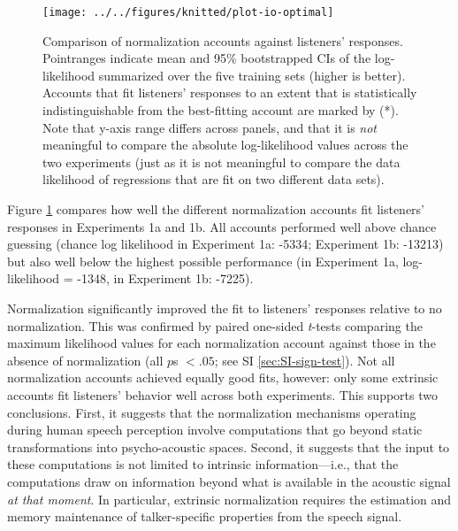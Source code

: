 \documentclass[preprint]{JASA}
\begin{document}
\begin{figure}[!ht]

{\centering \texttt{[image: ../../figures/knitted/plot-io-optimal]} 

}

\caption{Comparison of normalization accounts against listeners' responses. Pointranges indicate mean and 95\% bootstrapped CIs of the log-likelihood summarized over the five training sets (higher is better). Accounts that fit listeners' responses to an extent that is statistically indistinguishable from the best-fitting account are marked by (*). Note that y-axis range differs across panels, and that it is \emph{not} meaningful to compare the absolute log-likelihood values across the two experiments (just as it is not meaningful to compare the data likelihood of regressions that are fit on two different data sets).}\label{fig:plot-io-optimal}
\end{figure}

Figure \ref{fig:plot-io-optimal} compares how well the different normalization accounts fit listeners' responses in Experiments 1a and 1b. All accounts performed well above chance guessing (chance log likelihood in Experiment 1a: -5334; Experiment 1b: -13213) but also well below the highest possible performance (in Experiment 1a, log-likelihood = -1348, in Experiment 1b: -7225).

Normalization significantly improved the fit to listeners' responses relative to no normalization. This was confirmed by paired one-sided \emph{t}-tests comparing the maximum likelihood values for each normalization account against those in the absence of normalization (all \(p\)s \(< .05\); see SI \ref{sec:SI-sign-test}). Not all normalization accounts achieved equally good fits, however: only some extrinsic accounts fit listeners' behavior well across both experiments. This supports two conclusions. First, it suggests that the normalization mechanisms operating during human speech perception involve computations that go beyond static transformations into psycho-acoustic spaces. Second, it suggests that the input to these computations is not limited to intrinsic information---i.e., that the computations draw on information beyond what is available in the acoustic signal \emph{at that moment}. In particular, extrinsic normalization requires the estimation and memory maintenance of talker-specific properties from the speech signal.
\end{document}
